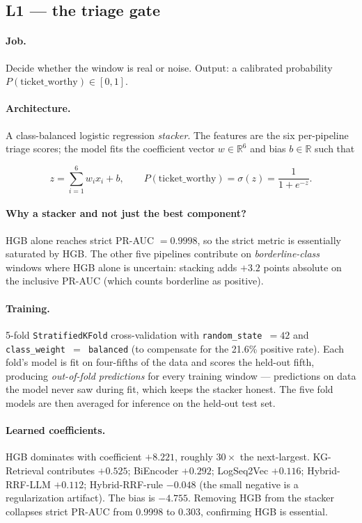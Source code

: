 \subsection{L1 --- the triage gate}

\paragraph{Job.} Decide whether the window is real or noise. Output: a calibrated probability $P(\text{ticket\_worthy}) \in [0, 1]$.

\paragraph{Architecture.} A class-balanced logistic regression \emph{stacker}. The features are the six per-pipeline triage scores; the model fits the coefficient vector $w \in \mathbb{R}^6$ and bias $b \in \mathbb{R}$ such that

\[
z = \sum_{i=1}^6 w_i x_i + b, \qquad P(\text{ticket\_worthy}) = \sigma(z) = \frac{1}{1 + e^{-z}}.
\]

\paragraph{Why a stacker and not just the best component?} HGB alone reaches strict PR-AUC $= 0.9998$, so the strict metric is essentially saturated by HGB. The other five pipelines contribute on \emph{borderline-class} windows where HGB alone is uncertain: stacking adds $+3.2$ points absolute on the inclusive PR-AUC (which counts borderline as positive).

\paragraph{Training.} 5-fold \texttt{StratifiedKFold} cross-validation with \texttt{random\_state $= 42$} and \texttt{class\_weight $= $ balanced} (to compensate for the 21.6\% positive rate). Each fold's model is fit on four-fifths of the data and scores the held-out fifth, producing \emph{out-of-fold predictions} for every training window --- predictions on data the model never saw during fit, which keeps the stacker honest. The five fold models are then averaged for inference on the held-out test set.

\paragraph{Learned coefficients.} HGB dominates with coefficient $+8.221$, roughly $30\times$ the next-largest. KG-Retrieval contributes $+0.525$; BiEncoder $+0.292$; LogSeq2Vec $+0.116$; Hybrid-RRF-LLM $+0.112$; Hybrid-RRF-rule $-0.048$ (the small negative is a regularization artifact). The bias is $-4.755$. Removing HGB from the stacker collapses strict PR-AUC from 0.9998 to 0.303, confirming HGB is essential.

